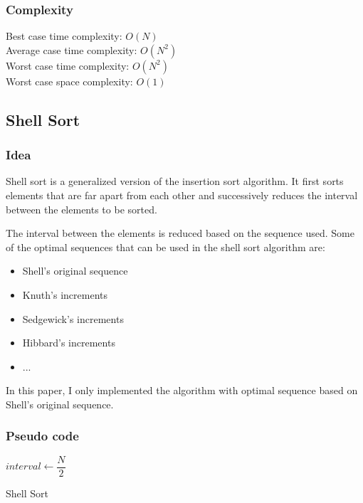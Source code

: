 \documentclass[11pt,a4paper]{article}
\begin{document}
\subsubsection*{Complexity}
Best case time complexity: $O(N)$ \\
Average case time complexity: $O(N^2)$\\
Worst case time complexity: $O(N^2)$ \\
Worst case space complexity: $O(1)$

\subsection{Shell Sort}
\subsubsection*{Idea}
Shell sort is a generalized version of the insertion sort algorithm. 
It first sorts elements that are far apart from each other and successively reduces the interval between the elements to be sorted.

The interval between the elements is reduced based on the sequence used. 
Some of the optimal sequences that can be used in the shell sort algorithm are:
\begin{itemize}
\item Shell's original sequence
\item Knuth's increments
\item Sedgewick's increments
\item Hibbard's increments
\item ...
\end{itemize}

In this paper, I only implemented the algorithm with optimal sequence based on Shell's original sequence.

\subsubsection*{Pseudo code}
\begin{algorithm2e}
  \SetAlgoLined
  $interval \gets \dfrac{N}{2}$\\
  \caption{Shell Sort}
\end{algorithm2e}
\end{document}

